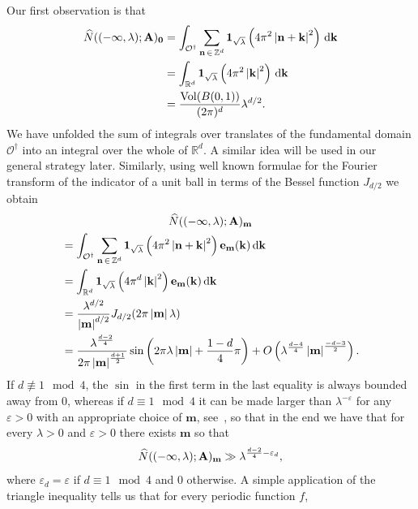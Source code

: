 \documentclass[10pt]{amsart}
\theoremstyle{definition}\newtheorem{defi}[theo]{Definition}\newtheorem{rema}[theo]{Remark}\newtheorem{exam}[theo]{Example}\newtheorem{nota}[theo]{Notation}
\newcommand{\de}{\, \mathrm{d}}
\newcommand{\R}{\mathbb R}
\newcommand{\Z}{\mathbb Z}
\newcommand{\CO}{\mathcal{O}}
\newcommand{\bone}{\boldsymbol 1}
\newcommand{\BA}{\mathbf A}
\newcommand{\be}{\mathbf e}
\newcommand{\bk}{\mathbf k}
\newcommand{\bm}{\mathbf m}
\newcommand{\bn}{\mathbf n}
\newcommand{\eps}{\varepsilon}
\newcommand{\bigo}[1]{O\left(#1 \right)}
\newcommand{\abs}[1]{\left\lvert #1 \right\rvert}
\let\oldhat\hat
\renewcommand*{\hat}[1]{\mathchoice{\widehat{#1}}{\widehat{#1}}{\oldhat{#1}}{\oldhat{#1}}}
\begin{document}
\begin{exem}
Our first observation is that
\begin{equation}
\begin{aligned}
\hat N((-\infty,\lambda);\BA)_{\boldsymbol 0} &=
\int_{\CO^\dagger}\sum_{\bn\,\in\,\Z^d} \bone_{\sqrt{\lambda}} \left(4
\pi^2\abs{\bn + \bk}^2 \right) \de \bk \\
&= \int_{\R^d} \bone_{\sqrt\lambda}\left(4\pi^2 \abs \bk^2 \right)
\de \bk \\
&= \frac{\operatorname{Vol}(B(0,1))}{(2\pi)^d}\lambda^{d/2}.
\end{aligned}
\end{equation}
We have unfolded the sum of integrals over translates of the fundamental domain $\CO^\dagger$ into an integral over the whole of $\R^d$. A similar idea will be used in our general strategy later. Similarly, using well known formulae for the Fourier transform of the indicator of a unit ball in terms of the Bessel function $J_{d/2}$ we obtain
\begin{multline}
\hat N((-\infty,\lambda);\BA)_{\bm}\\
\begin{aligned}
&=\int_{\CO^\dagger}\sum_{\bn\,\in\,\Z^d} \bone_{\sqrt{\lambda}} \left(4
\pi^2\abs{\bn + \bk}^2 \right) \be_\bm(\bk) \de \bk \\
&= \int_{\R^d} \bone_{\sqrt \lambda} \left(4\pi^d \abs \bk^2 \right)
\be_\bm(\bk) \de \bk \\
&= \frac{\lambda^{d/2}}{\abs \bm^{d/2}} J_{d/2}(2 \pi \abs \bm
\lambda) \\
&= \frac{\lambda^{\frac{d-2}{4}}}{2 \pi \abs \bm^{\frac{d+1}{2}} }\sin\left(2 \pi
\lambda \abs \bm + \frac{1-d}{4} \pi\right) +
\bigo{\lambda^{\frac{d-4}{4}} \abs \bm^{\frac{-d-3}{2}}}.
\end{aligned}
\end{multline}
If $d \not \equiv 1 \mod 4$, the $\sin$ in the first term in the last equality is always bounded away from $0$, whereas if $d \equiv 1 \mod 4$ it can be made larger than $\lambda^{- \eps}$ for any $\eps > 0$ with an appropriate choice of $\bm$, see~\cite{ParSob2001}, so that in the end we have that for every $\lambda > 0$ and $\eps > 0$ there exists $\bm$ so that
\begin{equation}
\hat N((-\infty,\lambda);\BA)_\bm \gg \lambda^{\frac{d-2}{4} - \eps_d},
\end{equation}
where $\eps_d = \eps$ if $d \equiv1 \mod 4$ and $0$ otherwise. A simple application of the triangle inequality tells us that for every periodic function $f$,
\begin{equation}

\end{equation}
\end{exem}
\end{document}
